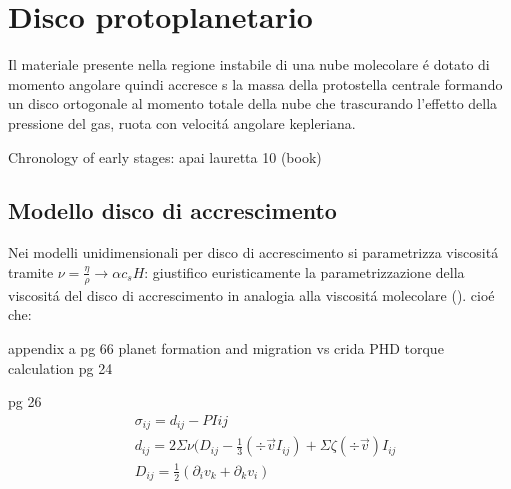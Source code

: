 {\let\clearpage\relax\let\cleardoublepage\relax
\chapter{Disco protoplanetario}
}

Il materiale presente nella regione instabile di una nube molecolare \'e dotato di momento angolare quindi accresce s la massa della protostella centrale formando un disco ortogonale al momento totale della nube che trascurando l'effetto della pressione del gas, ruota con velocit\'a angolare kepleriana.

\begin{workout}
Chronology of  early stages: apai lauretta 10 (book)
\end{workout}

\section{Modello disco di accrescimento}

Nei modelli unidimensionali per disco di accrescimento si parametrizza viscosit\'a tramite $\nu=\frac{\eta}{\rho}\to\alpha c_s H$: giustifico euristicamente la parametrizzazione della viscosit\'a del disco di accrescimento in analogia alla viscosit\'a molecolare (\cite{bouvier2002theory}).
cio\'e che:
\begin{workout}
appendix a pg 66 planet formation and migration vs crida PHD torque calculation pg 24
\end{workout}
\begin{workout}
pg 26
\begin{align}
&\sigma_{ij}=d_{ij}-PI{ij}\\
&d_{ij}=2\Sigma\nu(D_{ij}-\frac{1}{3}(\div{\vec{v}}I_{ij})+\Sigma\zeta(\div{\vec{v}})I_{ij}\\
&D_{ij}=\frac{1}{2}(\partial_iv_k+\partial_kv_i)
\end{align}
\end{workout}

